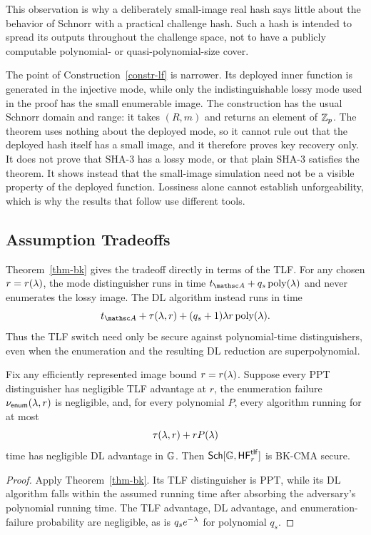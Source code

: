 This observation is why a deliberately small-image real hash says little about
the behavior of Schnorr with a practical challenge hash. Such a hash is intended
to spread its outputs throughout the challenge space, not to have a publicly
computable polynomial- or quasi-polynomial-size cover.

The point of Construction~\ref{constr-lf} is narrower. Its deployed inner
function is generated in the injective mode, while only the indistinguishable
lossy mode used in the proof has the small enumerable image. The construction
has the usual Schnorr domain and range: it takes $(R,m)$ and returns an element
of $\mathbb Z_p$. The theorem uses nothing about the deployed mode, so it cannot rule
out that the deployed hash itself has a small image, and it therefore proves key
recovery only. It does not prove that SHA-3 has a lossy mode, or that plain
SHA-3 satisfies the theorem. It shows instead that the small-image simulation
need not be a visible property of the deployed function. Lossiness alone cannot establish unforgeability, which is why the
results that follow use different tools.

\subsection{Assumption Tradeoffs}

Theorem~\ref{thm-bk} gives the tradeoff directly in terms of the TLF. For any
chosen $r=r(\lambda)$, the mode distinguisher runs in time
$t_{\advA}+q_s\poly(\secp)$ and never enumerates the lossy image. The DL
algorithm instead runs in time
$$
t_{\advA}+\tau(\secp,r)+(q_s+1)\secp r\poly(\secp).
$$
Thus the TLF switch need only be secure against polynomial-time distinguishers,
even when the enumeration and the resulting DL reduction are
superpolynomial.

\begin{corollary} \label{cor-bk-fixed}
Fix any efficiently represented image bound $r=r(\lambda)$. Suppose every PPT
distinguisher has negligible TLF advantage at $r$, the enumeration failure
$\nu_{\mathsf{enum}}(\lambda,r)$ is negligible, and, for every polynomial $P$,
every algorithm running for at most
$$
\tau(\lambda,r)+rP(\lambda)
$$
time has negligible DL advantage in $\mathbb{G}$. Then
$\mathsf{Sch}[\mathbb{G},\mathsf{HF}^{\mathsf{tlf}}_r]$ is BK-CMA secure.
\end{corollary}

\begin{proof}
Apply Theorem~\ref{thm-bk}. Its TLF distinguisher is PPT, while its DL
algorithm falls within the assumed running time after absorbing the
adversary's polynomial running time. The TLF advantage, DL advantage, and
enumeration-failure probability are negligible, as is $q_se^{-\lambda}$ for
polynomial $q_s$.
\end{proof}

